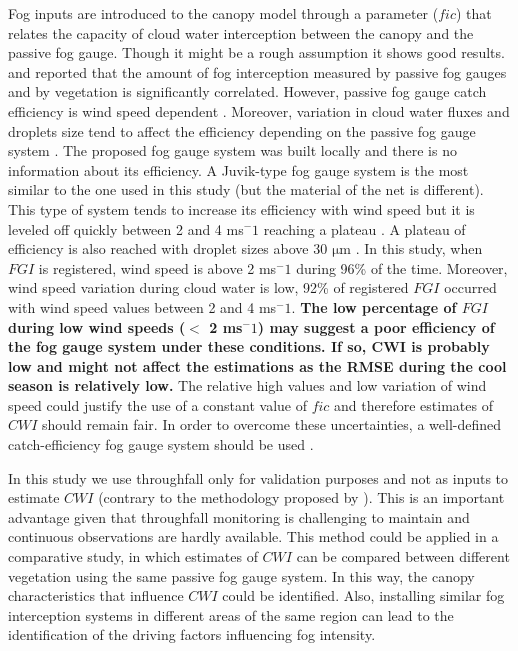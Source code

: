 \documentclass[a4paper,12pt]{article}
\begin{document}
\begin{linenumbers}
Fog inputs are introduced to the canopy model through a parameter ($fic$) that relates the capacity of cloud water interception between the canopy and the passive fog gauge. Though it might be a rough assumption it shows good results. \cite{Villegasetal2008} and \cite{Holwerdaetal2011} reported that the amount of fog interception measured by passive fog gauges and by vegetation is significantly correlated. However, passive fog gauge catch efficiency is wind speed dependent \citep{Frumauetal2011, Holwerdaetal2012}. Moreover, variation in cloud water fluxes and droplets size tend to affect the efficiency depending on the passive fog gauge system \citep{Frumauetal2011}. The proposed fog gauge system was built locally and there is no information about its efficiency. A Juvik-type fog gauge system \citep{Juvik1978} is the most similar to the one used in this study (but the material of the net is different). This type of system tends to increase its efficiency with wind speed but it is leveled off quickly between 2 and 4 ms$^-1$ reaching a plateau \citep{Frumauetal2011}.  A plateau of efficiency is also reached with droplet sizes above 30 $\mathrm{\mu}$m \citep{Frumauetal2011}. In this study, when $FGI$ is registered, wind speed is above 2 ms$^-1$ during 96\% of the time. Moreover, wind speed variation during cloud water is low, 92\% of registered $FGI$ occurred with wind speed values between 2 and 4 ms$^-1$. \textbf{The low percentage of $FGI$ during low wind speeds ($<$ 2 ms$^-1$) may suggest a poor efficiency of the fog gauge system under these conditions. If so, CWI is probably low and might not affect the estimations as the RMSE during the cool season is relatively low.} The relative high values and low variation of wind speed could justify the use of a constant value of $fic$ and therefore estimates of $CWI$ should remain fair. In order to overcome these uncertainties, a well-defined catch-efficiency fog gauge system should be used \citep{Holwerdaetal2011, Frumauetal2011}.

%

In this study we use throughfall only for validation purposes and not as inputs to estimate $CWI$ (contrary to the methodology proposed by \cite{Pryetetal2012a}). This is an important advantage given that throughfall monitoring is challenging to maintain and continuous observations are hardly available. This method could be applied in a comparative study, in which estimates of $CWI$ can be compared between different vegetation using the same passive fog gauge system. In this way, the canopy characteristics that influence $CWI$ could be identified. Also, installing similar fog interception systems in different areas of the same region can lead to the identification of the driving factors influencing fog intensity. 



\end{linenumbers}
\end{document}
